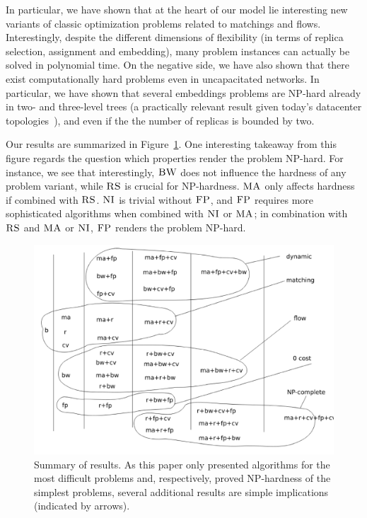 \documentclass[9pt,twocolumn]{scrartcl}
\newcommand{\CC}{\textsc{NI}}
\newcommand{\FP}{\textsc{FP}}
\newcommand{\RS}{\textsc{RS}}
\newcommand{\BW}{\textsc{BW}}
\newcommand{\MA}{\textsc{MA}}
\begin{document}
In particular, we have shown that
at the heart of our model lie interesting new variants of classic
optimization problems related to matchings and flows. Interestingly, despite the
different dimensions of flexibility (in terms of replica selection, assignment and embedding),
many problem instances can actually be solved in polynomial time.
On the negative side, we have also shown that there exist computationally hard
problems even in uncapacitated networks. In particular,
we have shown that several embeddings problems are NP-hard already in two- and three-level trees
(a practically relevant result given today's datacenter topologies~\cite{fattree}),
and even if the the number of replicas is bounded by two.


Our results are summarized in
Figure~\ref{fig:summary}.
One interesting takeaway from this figure regards
the question which properties render the problem
NP-hard. For instance, we see that interestingly, $\BW$
does not influence the hardness of any problem variant,
while $\RS$ is crucial for NP-hardness.
$\MA$ only affects hardness if combined with $\RS$.
$\CC$ is trivial without $\FP$, and $\FP$ requires
more sophisticated algorithms when combined with $\CC$ or $\MA$;
in combination with $\RS$ and $\MA$ or $\CC$, $\FP$ renders the
problem NP-hard.

\begin{figure}[t]
\includegraphics[width = \columnwidth]{figs/summary}
\caption{Summary of results. As this paper only presented algorithms for the most
difficult problems and, respectively, proved NP-hardness of the simplest
problems, several additional results are simple implications (indicated by arrows).}
\label{fig:summary}
\end{figure}
\end{document}
